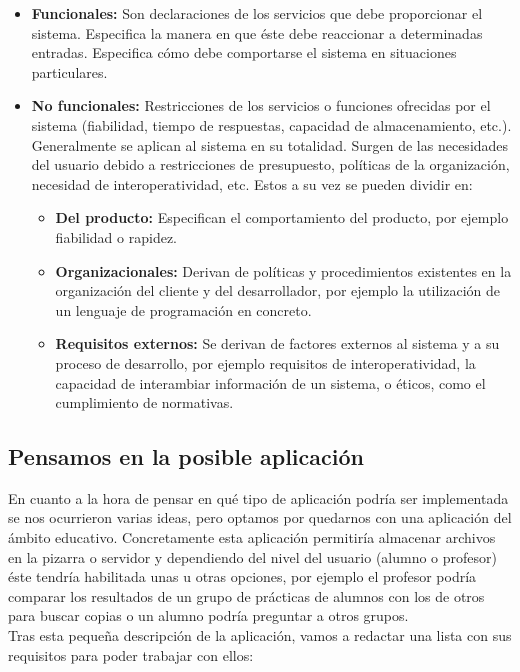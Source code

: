 \begin{itemize}
	\item \textbf{Funcionales: }Son declaraciones de los servicios que debe proporcionar el sistema. Especifica la manera en que éste debe reaccionar a determinadas entradas. Especifica cómo debe comportarse el sistema en situaciones particulares.
	\item \textbf{No funcionales: } Restricciones de los servicios o funciones ofrecidas por el sistema (fiabilidad, tiempo de respuestas, capacidad de almacenamiento, etc.). Generalmente se aplican al sistema en su totalidad. Surgen de las necesidades del usuario debido a restricciones de presupuesto, políticas de la organización, necesidad de interoperatividad, etc. Estos a su vez se pueden dividir en:
	\begin{itemize}
		\item\textbf{Del producto:} Especifican el comportamiento del producto, por ejemplo fiabilidad o rapidez.
		\item\textbf{Organizacionales:} Derivan de políticas y procedimientos existentes en la organización del cliente y del desarrollador, por ejemplo la utilización de un lenguaje de programación en concreto.
		\item\textbf{Requisitos externos:} Se derivan de factores externos al sistema y a su proceso de desarrollo, por ejemplo requisitos de interoperatividad, la capacidad de interambiar información de un sistema, o éticos, como el cumplimiento de normativas.
	\end{itemize}
\end{itemize}

\subsection{Pensamos en la posible aplicación}

En cuanto a la hora de pensar en qué tipo de aplicación podría ser implementada se nos ocurrieron varias ideas\cite{discusionaplicacion}, pero optamos por quedarnos con una aplicación del ámbito educativo. Concretamente esta aplicación permitiría almacenar archivos en la pizarra o servidor y dependiendo del nivel del usuario (alumno o profesor) éste tendría habilitada unas u otras opciones, por ejemplo el profesor podría comparar los resultados de un grupo de prácticas de alumnos con los de otros para buscar copias o un alumno podría preguntar a otros grupos.\\

Tras esta pequeña descripción de la aplicación, vamos a redactar una lista con sus requisitos para poder trabajar con ellos:

